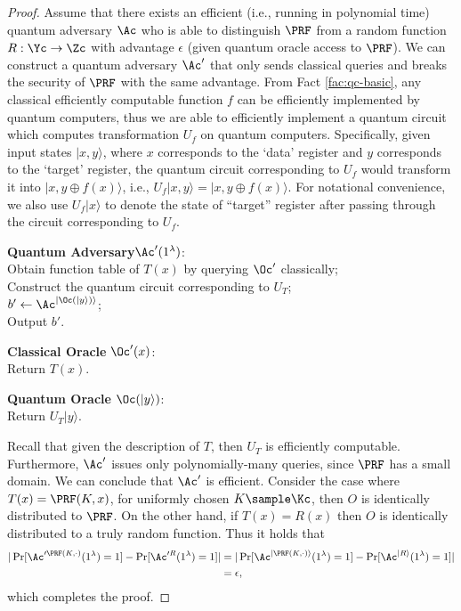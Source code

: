 \begin{proof}
	Assume that there exists an efficient (i.e., running in polynomial time) quantum adversary $\Ac$ who is able to distinguish $\PRF$ from a random function $R:\Yc \to \Zc$ with advantage $\epsilon$ (given quantum oracle access to $\PRF$). We can construct a quantum adversary $\Ac'$ that only sends classical queries and breaks the security of $\PRF$ with the same advantage.  From Fact \ref{fac:qc-basic}, any classical efficiently computable function $f$ can be efficiently implemented by quantum computers, thus we are able to efficiently implement a quantum circuit which computes transformation $U_f$ on quantum computers. Specifically, given input states $|x,y\rangle$, where $x$ corresponds to the `data' register and $y$ corresponds to the `target' register, the quantum circuit corresponding to $U_f$ would transform it into $|x,y\oplus f(x)\rangle$, i.e., $U_f |x,y\rangle = |x,y\oplus f(x)\rangle.$ For notational convenience, we also use $U_f |x\rangle$ to denote the state of ``target'' register after passing through the circuit corresponding to $U_f$.
	\begin{center}
		\begin{minipage}[t]{0.5\textwidth}
			\textbf{Quantum Adversary}$\Ac'(1^\lambda)$:\\
			Obtain function table of $T(x)$ by querying $\Oc'$ classically;\\
			Construct the quantum circuit corresponding to $U_T$;\\
			$b'\gets \Ac^{|\Oc(|y\rangle)\rangle}$;\\
			Output $b'$.
		\end{minipage}
		\begin{minipage}[t]{0.5\textwidth}
			\textbf{Classical Oracle} $\Oc'(x)$:\\
			Return $T(x)$.
		\end{minipage}
		\begin{minipage}[t]{0.5\textwidth}
			\textbf{Quantum Oracle} $\Oc(|y\rangle)$:\\
			Return $U_T|y\rangle$.
		\end{minipage}
	\end{center}
Recall that given the description of $T$, then $U_T$ is efficiently computable. Furthermore, $\Ac'$ issues only polynomially-many queries, since $\PRF$ has a small domain. We can conclude that $\Ac'$ is efficient. Consider the case where $T(x)=\PRF(K,x)$, for uniformly chosen $K\sample\Kc$, then $O$ is identically distributed to $\PRF$. On the other hand, if $T(x)=R(x)$ then $O$ is identically distributed to a truly random function. Thus it holds that
	\begin{align*}
	|\Pr[\Ac'^{\PRF(K,\cdot)}(1^\lambda) = 1] - \Pr[\Ac'^R(1^\lambda) = 1]|
		&= |\Pr[\Ac^{|\PRF(K,\cdot)\rangle}(1^\lambda) = 1] - \Pr[\Ac^{|R\rangle}(1^\lambda) = 1]|\\
		&= \epsilon,
	\end{align*}
	which completes the proof.
\end{proof}
